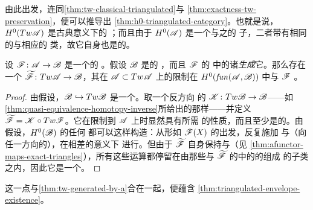 由此出发，连同\cref{thm:tw-classical-triangulated}与
\cref{thm:exactness-tw-preservation}，便可以推导出
\cref{thm:h0-triangulated-category}。也就是说，$H^0(Tw\mathscr{A})$ 是古典意义下的%
\trTriangulated\trCategory；而且由于 $H^0(\mathscr{A})$ 是一个与之\trEquivalence{}的%
\trFull{}子\trCategory，二者带有相同的\trTranslation\trFunctor{}与相应的%
\trDistinguishedTriangle{}类，故它自身也是\trTriangulated{}的。

\begin{lemma}\label{thm:tw-quasi-equivalence-generator}
设 $\mathscr{F}\colon\mathscr{A}\to\mathscr{B}$ 是一个\trCohomology\trFullyFaithful{}的%
\trAFunctor。假设 $\mathscr{B}$ 是\trTriangulated{}的 \trACategory，而且 $\mathscr{F}$ 的%
\trImage{}中的诸\trObject{}\emph{生成}它。那么存在一个\trQuasiequivalence{}%
$\widetilde{\mathscr{F}}\colon Tw\mathscr{A}\to\mathscr{B}$，其在 $\mathscr{A}\subset Tw\mathscr{A}$
上的限制在 $H^0(\mathit{fun}(\mathscr{A},\mathscr{B}))$ 中与 $\mathscr{F}$ \trIsomorphic。
\end{lemma}

\begin{proof}
由假设，$\mathscr{B}\hookrightarrow Tw\mathscr{B}$ 是一个\trQuasiequivalence。取一个反方向
的\trQuasiequivalence{} $\mathscr{K}\colon Tw\mathscr{B}\to\mathscr{B}$——如
\cref{thm:quasi-equivalence-homotopy-inverse}所给出的那样——并定义
$\widetilde{\mathscr{F}}=\mathscr{K}\circ Tw\mathscr{F}$。它在限制到 $\mathscr{A}$ 上时显然具有所需
的性质，而且至少是\trCohomology\trFullyFaithful{}的。由假设，$H^0(\mathscr{B})$ 的任何%
\trObject{}都可以这样构造：从形如 $\mathscr{F}(X)$ 的\trObject{}出发，反复施加%
\trMappingCone{}与（向任一方向的）\trSuspension，在相差\trIsomorphism{}的意义下
进行。但由于 $\widetilde{\mathscr{F}}$ 自身保持\trExactTriangle{}与\trSuspension（见
\cref{thm:afunctor-maps-exact-triangles}），所有这些运算都停留在由那些与
$\widetilde{\mathscr{F}}$ 的\trImage{}中的\trObject{}\trIsomorphic{}的\trObject{}组成
的子类之内，因此它是一个\trQuasiequivalence。
\end{proof}

这一点与\cref{thm:tw-generated-by-a}合在一起，便蕴含
\cref{thm:triangulated-envelope-existence}。

